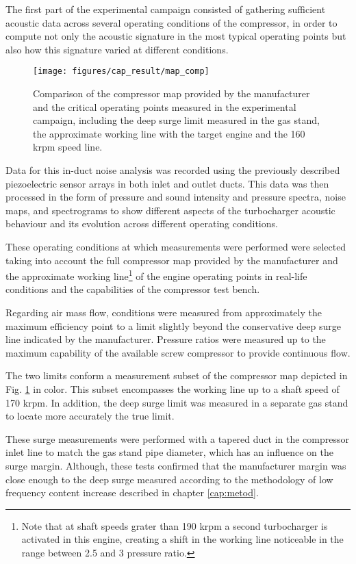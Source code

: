 The first part of the experimental campaign consisted of gathering sufficient acoustic data across several operating conditions of the compressor, in order to compute not only the acoustic signature in the most typical operating points but also how this signature varied at different conditions.

\begin{figure}[tbh!]
\centering
\vspace{3mm}
\texttt{[image: figures/cap\_result/map\_comp]}
\caption{Comparison of the compressor map provided by the manufacturer and the critical operating points measured in the experimental campaign, including the deep surge limit measured in the gas stand, the approximate working line with the target engine and the 160 krpm speed line.}
\label{fig:result_map_comp}
\end{figure}

Data for this in-duct noise analysis was recorded using the previously described piezoelectric sensor arrays in both inlet and outlet ducts. This data was then processed in the form of pressure and sound intensity and pressure spectra, noise maps, and spectrograms to show different aspects of the turbocharger acoustic behaviour and its evolution across different operating conditions.

These operating conditions at which measurements were performed were selected taking into account the full compressor map provided by the manufacturer and the approximate working line\footnote{Note that at shaft speeds grater than 190 krpm a second turbocharger is activated in this engine, creating a shift in the working line noticeable in the range between 2.5 and 3 pressure ratio.} of the engine operating points in real-life conditions and the capabilities of the compressor test bench. 

Regarding air mass flow, conditions were measured from approximately the maximum efficiency point to a limit slightly beyond the conservative deep surge line indicated by the manufacturer. Pressure ratios were measured up to the maximum capability of the available screw compressor to provide continuous flow.

The two limits conform a measurement subset of the compressor map depicted in Fig. \ref{fig:result_map_comp} in color. This subset encompasses the working line up to a shaft speed of 170 krpm. In addition, the deep surge limit was measured in a separate gas stand to locate more accurately the true limit.

These surge measurements were performed with a tapered duct in the compressor inlet line to match the gas stand pipe diameter, which has an influence on the surge margin. Although, these tests confirmed that the manufacturer margin was close enough to the deep surge measured according to the methodology of low frequency content increase described in chapter \ref{cap:metod}. 

